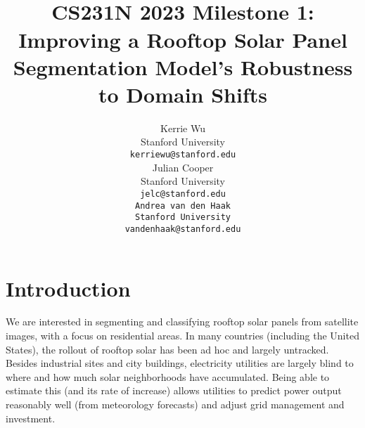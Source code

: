 \documentclass[10pt,twocolumn,letterpaper]{article}
\begin{document}
\title{\\CS231N 2023 Milestone 1: Improving a Rooftop Solar Panel Segmentation Model's Robustness to Domain Shifts}


\author{Kerrie Wu \\
  Stanford University \\
  {\tt\small kerriewu@stanford.edu} \\
   \And
    Julian Cooper \\
  Stanford University \\
  \tt\small {jelc@stanford.edu} \\
   \And
   Andrea van den Haak \\
  Stanford University \\
  \tt\small {vandenhaak@stanford.edu} \\
}
\maketitle


\section{Introduction}
\label{sec:intro}

We are interested in segmenting and classifying rooftop solar panels from satellite images, with a focus on residential areas. In many countries (including the United States), the rollout of rooftop solar has been ad hoc and largely untracked. Besides industrial sites and city buildings, electricity utilities are largely blind to where and how much solar neighborhoods have accumulated. Being able to estimate this (and its rate of increase) allows utilities to predict power output reasonably well (from meteorology forecasts) and adjust grid management and investment. 
\end{document}
